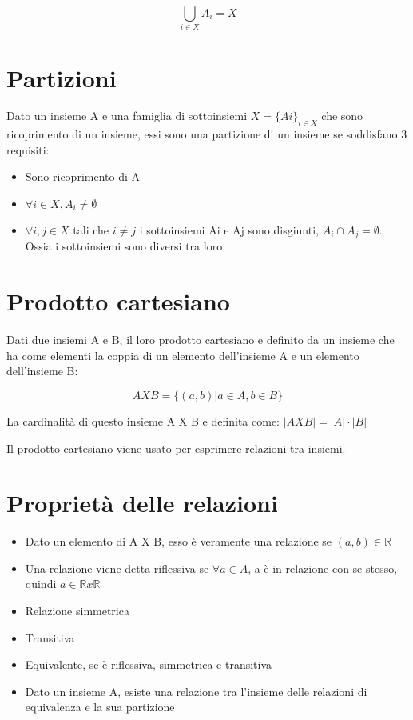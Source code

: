 \documentclass[a4paper, 10pt]{article}
\begin{document}
$$ \bigcup_{i \in X}A_i = X $$

\section{Partizioni}

Dato un insieme A e una famiglia di sottoinsiemi $ X = \{Ai\}_{i \in X} $ che sono ricoprimento di un insieme, essi sono una partizione di un insieme se soddisfano 3 requisiti:

\begin{itemize}
	\item Sono ricoprimento di A
	\item $ \forall i \in X, A_i \neq\emptyset $
	\item $ \forall i, j \in X $ tali che $ i \neq j $ i sottoinsiemi Ai e Aj sono disgiunti, $ A_i \cap A_j  = \emptyset $. Ossia i sottoinsiemi sono diversi tra loro
\end{itemize}

\section{Prodotto cartesiano}

Dati due insiemi A e B, il loro prodotto cartesiano e definito da un insieme che ha come elementi la coppia di un elemento dell'insieme A e un elemento dell'insieme B:

$$ A X B = \{(a,b) | a \in A, b \in B\} $$

La cardinalità di questo insieme A X B e definita come: $ |AXB| = |A| \cdot |B| $

Il prodotto cartesiano viene usato per esprimere relazioni tra insiemi.

\section{Proprietà delle relazioni}

\begin{itemize}
	\item Dato un elemento di A X B, esso è veramente una relazione se $ (a, b) \in \mathbb{R} $
	\item Una relazione viene detta riflessiva se $ \forall a \in A$, a è in relazione con se stesso, quindi $ a \in \mathbb{R} x \mathbb{R} $
	\item Relazione simmetrica
	\item Transitiva
	\item Equivalente, se è riflessiva, simmetrica e transitiva
	\item Dato un insieme A, esiste una relazione tra l'insieme delle relazioni di equivalenza e la sua partizione
\end{itemize}
\end{document}
